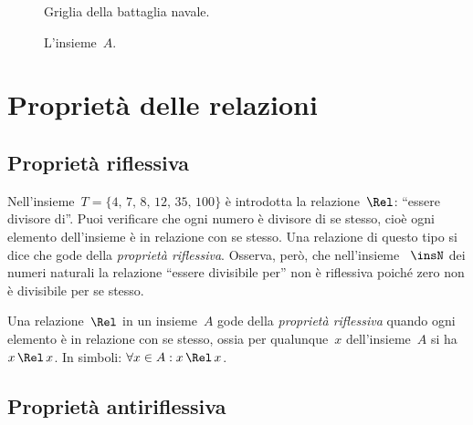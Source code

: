 \ovalbox{\risolvii \ref{ese:7.12}, \ref{ese:7.13}, \ref{ese:7.14}, \ref{ese:7.15}, \ref{ese:7.16}, \ref{ese:7.17}}
\begin{figure}[hb]
\begin{minipage}[t]{.45\textwidth}
 \centering
 
 \caption{Griglia della battaglia navale.}\label{fig:7.1}
\end{minipage}\hfil
\begin{minipage}[t]{.45\textwidth}
 \centering
 
 \caption{L'insieme~$A$.}\label{fig:7.2}
\end{minipage}
\end{figure}

\pagebreak
\section{Proprietà delle relazioni}
\subsection{Proprietà riflessiva}

\begin{exrig}
 \begin{esempio}

Nell'insieme~$T = \{\text{4, 7, 8, 12, 35, 100}\}$ è introdotta la relazione~$\Rel$: ``essere divisore di''.
Puoi verificare che ogni numero è divisore di se stesso, cioè ogni elemento dell'insieme è in relazione
con se stesso. Una relazione di questo tipo si dice che gode della \emph{proprietà riflessiva}.
Osserva, però, che nell'insieme ~$\insN$ dei numeri naturali la relazione ``essere divisibile per'' non è riflessiva poiché zero non è divisibile per se stesso.
 \end{esempio}
\end{exrig}

\begin{definizione}
Una relazione~$\Rel$ in un insieme~$A$ gode della \emph{proprietà riflessiva} quando ogni elemento è in relazione con se stesso, ossia per qualunque~$x$ dell'insieme~$A$ si ha~$x \,\Rel\, x$.
In simboli: $\forall x \in A: x \,\Rel\, x$.
\end{definizione}

\ovalbox{\risolvi \ref{ese:7.18}}

\subsection{Proprietà antiriflessiva}

